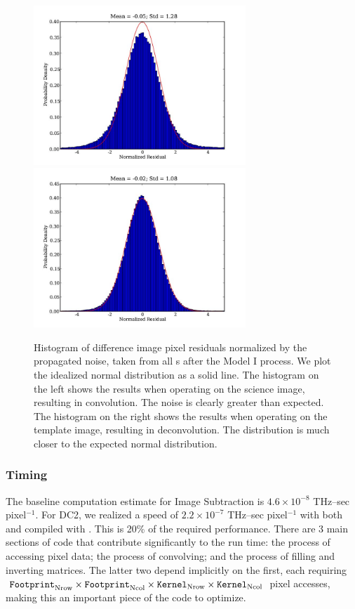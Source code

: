 \begin{figure}[htbp]
\includegraphics[height=60mm]{figures/sig30Sall.jpg}
\includegraphics[height=60mm]{figures/sig30all.jpg}
\caption{Histogram of difference image pixel residuals normalized by 
the propagated noise, taken from all s after the
 Model I process.  We plot the idealized normal
distribution as a solid line.  The histogram on the left shows the
results when operating on the science image, resulting in convolution.
The noise is clearly greater than expected.  The histogram on the right shows
the results when operating on the template image, resulting in
deconvolution.  The distribution is much closer to the expected normal
distribution.}
\label{fig-conv-stats}
\end{figure}

\subsubsection{Timing}

The baseline computation estimate for Image Subtraction 
is $4.6 \times
10^{-8}$ THz--sec pixel$^{-1}$.  For DC2, we realized a speed of $2.2
\times 10^{-7}$ THz--sec pixel$^{-1}$ with both  and
 compiled with .  This is 20\% of the 
required performance.  There are 3 main sections of code that
contribute significantly to the run time: the process of accessing
pixel data; the process of convolving; and the process of filling and
inverting matrices.  The latter two depend implicitly on the first,
each requiring $\texttt{Footprint}_{\rm Nrow} \times
\texttt{Footprint}_{\rm Ncol} \times
\texttt{Kernel}_{\rm Nrow} \times \texttt{Kernel}_{\rm Ncol}$ pixel 
accesses, making this an important piece of the code to optimize.

